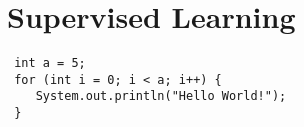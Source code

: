 \maketitle
\chapter{Supervised Learning}
\begin{verbatim}
 int a = 5;
 for (int i = 0; i < a; i++) {
 	System.out.println("Hello World!");
 }


\end{verbatim}